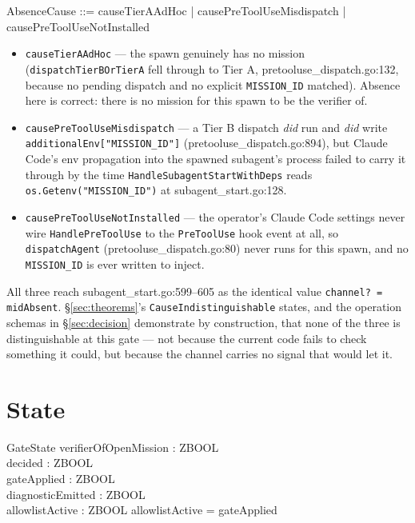 \documentclass[a4paper,10pt,fleqn]{article}
\newcommand{\field}[1]{\texttt{#1}}
\begin{document}
\begin{zed}
AbsenceCause ::= causeTierAAdHoc | causePreToolUseMisdispatch
               | causePreToolUseNotInstalled
\end{zed}

\begin{itemize}
  \item \field{causeTierAAdHoc} --- the spawn genuinely has no
    mission (\field{dispatchTierBOrTierA} fell through to Tier A,
    pretooluse\_dispatch.go:132, because no pending dispatch and no
    explicit \field{MISSION\_ID} matched). Absence here is correct:
    there is no mission for this spawn to be the verifier of.
  \item \field{causePreToolUseMisdispatch} --- a Tier B dispatch
    \emph{did} run and \emph{did} write
    \field{additionalEnv["MISSION\_ID"]} (pretooluse\_dispatch.go:894),
    but Claude Code's env propagation into the spawned subagent's
    process failed to carry it through by the time
    \field{HandleSubagentStartWithDeps} reads
    \field{os.Getenv("MISSION\_ID")} at subagent\_start.go:128.
  \item \field{causePreToolUseNotInstalled} --- the operator's Claude
    Code settings never wire \field{HandlePreToolUse} to the
    \field{PreToolUse} hook event at all, so \field{dispatchAgent}
    (pretooluse\_dispatch.go:80) never runs for this spawn, and no
    \field{MISSION\_ID} is ever written to inject.
\end{itemize}

All three reach subagent\_start.go:599--605 as the identical value
\field{channel? = midAbsent}. \S\ref{sec:theorems}'s
\field{CauseIndistinguishable} states, and the operation schemas in
\S\ref{sec:decision} demonstrate by construction, that none of the
three is distinguishable at this gate --- not because the current
code fails to check something it could, but because the channel
carries no signal that would let it.

\section{State}
\label{sec:state}

\begin{schema}{GateState}
verifierOfOpenMission : ZBOOL \\
decided : ZBOOL \\
gateApplied : ZBOOL \\
diagnosticEmitted : ZBOOL \\
allowlistActive : ZBOOL
\where
allowlistActive = gateApplied
\end{schema}
\end{document}
